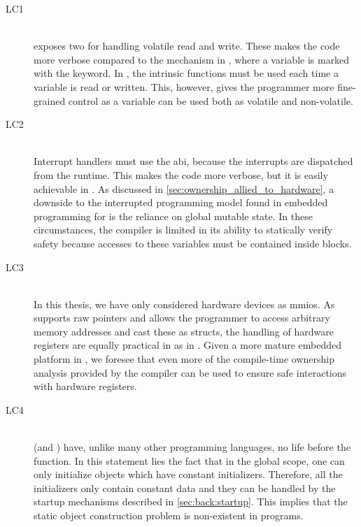 \begin{description}
\item [LC1 {\lci}] \hfill \\
  {\rust} exposes two  for handling volatile read and write.
  These makes the code more verbose compared to the mechanism in {\C}, where a variable is marked with the  keyword.
  In {\rust}, the intrinsic functions must be used each time a variable is read or written.
  This, however, gives the programmer more fine-grained control as a variable can be used both as volatile and non-volatile.

\item [LC2 {\lcii}] \hfill \\
  Interrupt handlers must use the {\C} \gls{abi}, because the interrupts are dispatched from the {\C} runtime.
  This makes the code more verbose, but it is easily achievable in {\rust}.
  As discussed in \autoref{sec:ownership_allied_to_hardware}, a downside to the interrupted programming model found in embedded programming for {\rust} is the reliance on global mutable state.
  In these circumstances, the compiler is limited in its ability to statically verify safety because accesses to these variables must be contained inside {\unsafe} blocks.

\item [LC3 {\lciii}] \hfill \\
  In this thesis, we have only considered hardware devices as \glspl{mmio}.
  As {\rust} supports raw pointers and allows the programmer to access arbitrary memory addresses and cast these as structs, the handling of hardware registers are equally practical in {\rust} as in {\C}.
  Given a more mature embedded platform in {\rust}, we foresee that even more of the compile-time ownership analysis provided by the {\rust} compiler can be used to ensure safe interactions with hardware registers.

\item [LC4 {\lciv}] \hfill \\
  {\rust} (and {\C}) have, unlike many other programming languages, no life before the {\main} function.
  In this statement lies the fact that in the global scope, one can only initialize objects which have constant initializers.
  Therefore, all the initializers only contain constant data and they can be handled by the startup mechanisms described in \autoref{sec:back:startup}.
  This implies that the static object construction problem is non-existent in {\rust} programs.


\end{description}
